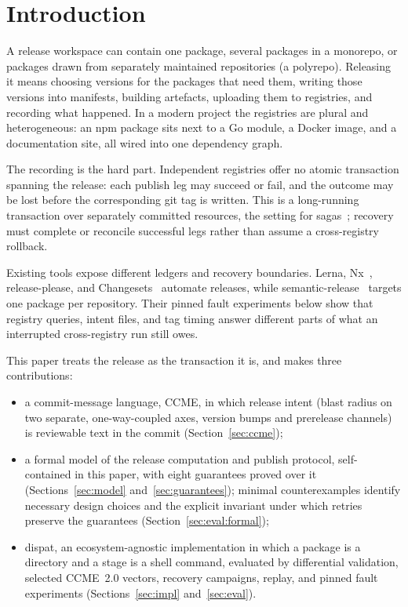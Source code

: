 \documentclass[sigconf,nonacm]{acmart}
\begin{document}

\maketitle

\section{Introduction}
\label{sec:intro}

A release workspace can contain one package, several packages in a monorepo,
or packages drawn from separately maintained repositories (a polyrepo).
Releasing it means choosing versions for the packages that need them,
writing those versions into manifests, building artefacts,
uploading them to registries, and recording what happened. In a modern
project the registries are plural and heterogeneous: an npm package sits
next to a Go module, a Docker image, and a documentation site, all wired
into one dependency graph.

The recording is the hard part. Independent registries offer no atomic
transaction spanning the release: each publish leg may succeed or fail, and
the outcome may be lost before the corresponding git tag is written. This is
a long-running transaction over separately committed resources, the setting
for sagas~\cite{sagas}; recovery must complete or reconcile successful legs
rather than assume a cross-registry rollback.

Existing tools expose different ledgers and recovery boundaries. Lerna,
Nx~\cite{nx}, release-please, and Changesets~\cite{changesets} automate
releases, while semantic-release~\cite{semanticrelease} targets one package
per repository. Their pinned fault experiments below show that registry
queries, intent files, and tag timing answer different parts of what an
interrupted cross-registry run still owes.

This paper treats the release as the transaction it is, and makes three
contributions:
\begin{itemize}
  \item a commit-message language, CCME, in which release intent
    (blast radius on two separate, one-way-coupled axes, version bumps and
    prerelease channels) is reviewable text in the commit
    (Section~\ref{sec:ccme});
  \item a formal model of the release computation and publish protocol,
    self-contained in this paper, with eight guarantees proved over it
    (Sections~\ref{sec:model} and~\ref{sec:guarantees}); minimal counterexamples identify necessary design choices and
    the explicit invariant under which retries preserve the guarantees
    (Section~\ref{sec:eval:formal});
  \item dispat, an ecosystem-agnostic implementation in which a package is
    a directory and a stage is a shell command, evaluated by differential
    validation, selected CCME~2.0 vectors, recovery campaigns, replay, and
    pinned fault experiments (Sections~\ref{sec:impl} and~\ref{sec:eval}).
\end{itemize}
\end{document}
